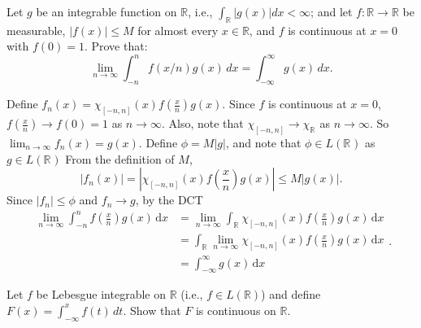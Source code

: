 \pagebreak

\begin{problem}{3}
  Let $g$ be an integrable function on $\mathbb{R}$, i.e., $\int_{\mathbb{R}} |g(x)| dx < \infty$; and let $f : \mathbb{R} \to \mathbb{R}$ be measurable, $|f(x)| \leq M$ for almost every $x \in \mathbb{R}$, and $f$ is continuous at $x = 0$ with $f(0) = 1$. Prove that:
  \[
  \lim_{n \to \infty} \int_{-n}^{n} f(x/n)g(x) \, dx = \int_{-\infty}^{\infty} g(x) \, dx.
  \]
\end{problem}

\begin{solution}
Define $f_{n}(x) = \chi_{\left[ -n,n \right]}(x) f\left( \frac{x}{n} \right) g(x)$.
Since $f$ is continuous at $x = 0$, $f\left( \frac{x}{n} \right) \to f(0) = 1$ as $n \to \infty$.
Also, note that $\chi_{\left[ -n,n \right]} \to \chi_{\mathbb{R}^{}}$ as $n \to \infty$.
So $\lim_{n \to \infty} f_{n}(x) = g(x)$.
Define $\phi = M |g|$, and note that $\phi \in L(\mathbb{R}^{})$ as $g \in L(\mathbb{R}^{})$
From the definition of $M$, 
\[
  \left| f_{n}(x) \right| =  \left| \chi_{\left[ -n,n \right]}(x)f\left( \frac{x}{n} \right)g(x) \right| \leq M \left| g(x) \right|
.\] 
Since $\left| f_{n} \right| \leq \phi$ and $f_{n} \to g$, by the DCT
\[
  \begin{aligned}
    \lim_{n \to \infty} \int_{ -n}^{n} \! f(\frac{x}{n}) g(x) \, \mathrm{d}x &= \lim_{n \to \infty} \int_{ \mathbb{R}^{}} \! \chi_{\left[ -n,n \right]}(x) f\left( \frac{x}{n} \right) g(x) \, \mathrm{d}x\\
     &=  \int_{ \mathbb{R}^{}} \! \lim_{n \to \infty} \chi_{\left[ -n,n \right]}(x) f\left( \frac{x}{n} \right) g(x) \, \mathrm{d}x \\
     &=  \int_{ -\infty}^{\infty} \! g(x) \, \mathrm{d}x 
  \end{aligned}
.\] 
\end{solution}

\pagebreak


\begin{problem}{4}
  Let $f$ be Lebesgue integrable on $\mathbb{R}$ (i.e., $f \in L(\mathbb{R})$) and define $F(x) = \int_{-\infty}^{x} f(t) \, dt$. Show that $F$ is continuous on $\mathbb{R}$.
\end{problem}

